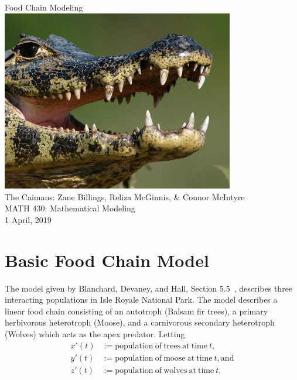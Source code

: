 \documentclass[10pt]{article}
\newcommand{\np}{\vfill\newpage}
\begin{document}

\vfill
\begin{center}
    \Huge{Food Chain Modeling} \\
    \vspace{0.15in}
    \includegraphics[width=4in]{caiman.jpg} \\
    \vspace{0.15in}
    \large{The Caimans: Zane Billings, Reliza McGinnis, \& Connor McIntyre} \\
    \large{MATH 430: Mathematical Modeling} \\
    \large{1 April, 2019} \\
\end{center}

\tableofcontents
\np


\section{Basic Food Chain Model}

The model given by Blanchard, Devaney, and Hall, Section 5.5~\cite{bdh}, describes three interacting populations in Isle Royale National Park. The model describes a linear food chain consisting of an autotroph (Balsam fir trees), a primary herbivorous heterotroph (Moose), and a carnivorous secondary heterotroph (Wolves) which acts as the apex predator. Letting
\begin{align*}
x'(t) &:= \mathrm{ population \ of \ trees \ at \ time \ } t, \\
y'(t) &:= \mathrm{ population \ of \ moose \ at \ time \ } t, \mathrm{ and} \\
z'(t) &:= \mathrm{ population \ of \ wolves \ at \ time \ } t, 
\end{align*}
\end{document}
